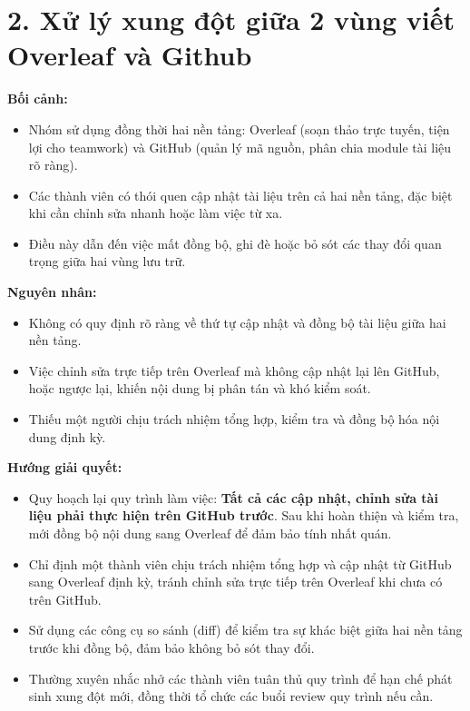 \documentclass[12pt,a4paper]{article}
\begin{document}
\section*{2. Xử lý xung đột giữa 2 vùng viết Overleaf và Github}

\textbf{Bối cảnh:}
\begin{itemize}
    \item Nhóm sử dụng đồng thời hai nền tảng: Overleaf (soạn thảo trực tuyến, tiện lợi cho teamwork) và GitHub (quản lý mã nguồn, phân chia module tài liệu rõ ràng).
    \item Các thành viên có thói quen cập nhật tài liệu trên cả hai nền tảng, đặc biệt khi cần chỉnh sửa nhanh hoặc làm việc từ xa.
    \item Điều này dẫn đến việc mất đồng bộ, ghi đè hoặc bỏ sót các thay đổi quan trọng giữa hai vùng lưu trữ.
\end{itemize}

\textbf{Nguyên nhân:}
\begin{itemize}
    \item Không có quy định rõ ràng về thứ tự cập nhật và đồng bộ tài liệu giữa hai nền tảng.
    \item Việc chỉnh sửa trực tiếp trên Overleaf mà không cập nhật lại lên GitHub, hoặc ngược lại, khiến nội dung bị phân tán và khó kiểm soát.
    \item Thiếu một người chịu trách nhiệm tổng hợp, kiểm tra và đồng bộ hóa nội dung định kỳ.
\end{itemize}

\textbf{Hướng giải quyết:}
\begin{itemize}
    \item Quy hoạch lại quy trình làm việc: \textbf{Tất cả các cập nhật, chỉnh sửa tài liệu phải thực hiện trên GitHub trước}. Sau khi hoàn thiện và kiểm tra, mới đồng bộ nội dung sang Overleaf để đảm bảo tính nhất quán.
    \item Chỉ định một thành viên chịu trách nhiệm tổng hợp và cập nhật từ GitHub sang Overleaf định kỳ, tránh chỉnh sửa trực tiếp trên Overleaf khi chưa có trên GitHub.
    \item Sử dụng các công cụ so sánh (diff) để kiểm tra sự khác biệt giữa hai nền tảng trước khi đồng bộ, đảm bảo không bỏ sót thay đổi.
    \item Thường xuyên nhắc nhở các thành viên tuân thủ quy trình để hạn chế phát sinh xung đột mới, đồng thời tổ chức các buổi review quy trình nếu cần.
\end{itemize}
\end{document}

